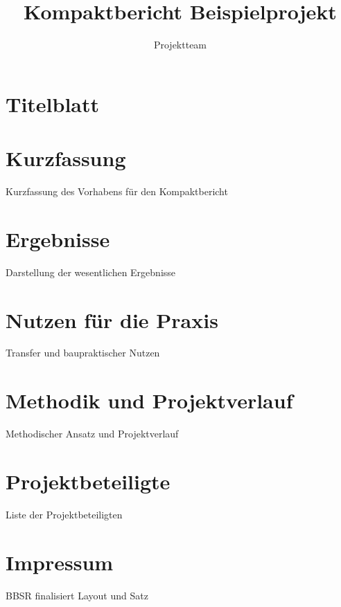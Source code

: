 \documentclass[type=kompaktbericht]{zukunftbau}
\title{Kompaktbericht Beispielprojekt}
\author{Projektteam}
\begin{document}
\section*{Titelblatt}
\maketitle

\section*{Kurzfassung}
Kurzfassung des Vorhabens für den Kompaktbericht

\section{Ergebnisse}
Darstellung der wesentlichen Ergebnisse

\section{Nutzen für die Praxis}
Transfer und baupraktischer Nutzen

\section{Methodik und Projektverlauf}
Methodischer Ansatz und Projektverlauf \cite{example2026}

\printbibliography

\appendix
\section{Projektbeteiligte}
Liste der Projektbeteiligten

\section*{Impressum}
BBSR finalisiert Layout und Satz
\end{document}

